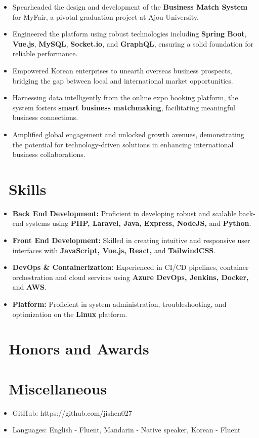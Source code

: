 \documentclass{resume}
\begin{document}
\begin{itemize}
  \item Spearheaded the design and development of the \textbf{Business Match System} for MyFair, a pivotal graduation project at Ajou University.
  \item Engineered the platform using robust technologies including \textbf{Spring Boot}, \textbf{Vue.js}, \textbf{MySQL}, \textbf{Socket.io}, and \textbf{GraphQL}, ensuring a solid foundation for reliable performance.
  \item Empowered Korean enterprises to unearth overseas business prospects, bridging the gap between local and international market opportunities.
  \item Harnessing data intelligently from the online expo booking platform, the system fosters \textbf{smart business matchmaking}, facilitating meaningful business connections.
  \item Amplified global engagement and unlocked growth avenues, demonstrating the potential for technology-driven solutions in enhancing international business collaborations.
\end{itemize}

\section{\faCogs\ Skills}
\begin{itemize}[parsep=0.5ex]
  \item \textbf{Back End Development:} Proficient in developing robust and scalable back-end systems using \textbf{PHP, Laravel, Java, Express, NodeJS,} and \textbf{Python}.
  \item \textbf{Front End Development:} Skilled in creating intuitive and responsive user interfaces with \textbf{JavaScript, Vue.js, React,} and \textbf{TailwindCSS}.
  \item \textbf{DevOps \& Containerization:} Experienced in CI/CD pipelines, container orchestration and cloud services using \textbf{Azure DevOps, Jenkins, Docker,} and \textbf{AWS}.
  \item \textbf{Platform:} Proficient in system administration, troubleshooting, and optimization on the \textbf{Linux} platform.
\end{itemize}

\section{\faHeartO\ Honors and Awards}

\section{\faInfo\ Miscellaneous}
\begin{itemize}[parsep=0.5ex]
  \item GitHub: https://github.com/jishen027
  \item Languages: English - Fluent, Mandarin - Native speaker, Korean - Fluent
\end{itemize}

%
%
\end{document}
